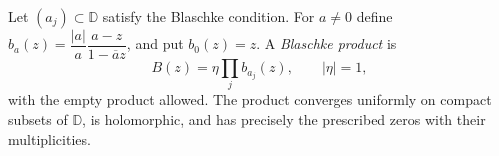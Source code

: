 
Let $(a_j)\subset\mathbb D$ satisfy the Blaschke condition. For $a\ne0$ define $b_a(z)=\dfrac{|a|}{a}\dfrac{a-z}{1-\overline a z}$, and put $b_0(z)=z$. A \emph{Blaschke product} is
\[
B(z)=\eta\prod_j b_{a_j}(z),\qquad |\eta|=1,
\]
with the empty product allowed. The product converges uniformly on compact subsets of $\mathbb D$, is holomorphic, and has precisely the prescribed zeros with their multiplicities.

